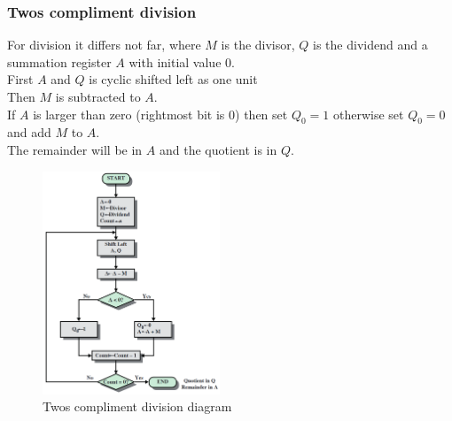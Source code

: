 \documentclass[12pt, a4paper]{article}
\begin{document}
			\subsubsection{Twos compliment division}
				For division it differs not far, where $M$ is the divisor, $Q$ is the dividend and a summation register $A$ with initial value 0.\\
				First $A$ and $Q$ is cyclic shifted left as one unit\\
				Then $M$ is subtracted to $A$.\\
				If $A$ is larger than zero (rightmost bit is 0) then set $Q_0=1$ otherwise set $Q_0=0$ and add $M$ to $A$.\\
				The remainder will be in $A$ and the quotient is in $Q$.
				\begin{figure}[h!]
					\includegraphics[width=200px]{assets/twosComplimentDivision.png}
					\centering
					\caption{Twos compliment division diagram}
				\end{figure}
\end{document}

